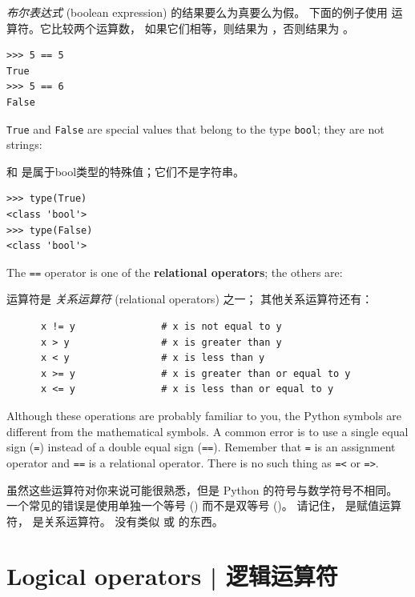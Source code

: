 {{{{\em 布尔表达式} (boolean expression) 的结果要么为真要么为假。
下面的例子使用 \li{==} 运算符。它比较两个运算数，
如果它们相等，则结果为  ，否则结果为  。

\begin{lstlisting}
>>> 5 == 5
True
>>> 5 == 6
False
\end{lstlisting}

%
{\tt True} and {\tt False} are special
values that belong to the type {\tt bool}; they are not strings:

 和  是属于bool类型的特殊值；它们不是字符串。
  
  
  

\begin{lstlisting}
>>> type(True)
<class 'bool'>
>>> type(False)
<class 'bool'>
\end{lstlisting}

%
The {\tt ==} operator is one of the {\bf relational operators}; the
others are:

\li{==} 运算符是 {\em 关系运算符} (relational operators) 之一； 其他关系运算符还有：


\begin{lstlisting}
      x != y               # x is not equal to y
      x > y                # x is greater than y
      x < y                # x is less than y
      x >= y               # x is greater than or equal to y
      x <= y               # x is less than or equal to y
\end{lstlisting}

%
Although these operations are probably familiar to you, the Python
symbols are different from the mathematical symbols.  A common error
is to use a single equal sign ({\tt =}) instead of a double equal sign
({\tt ==}).  Remember that {\tt =} is an assignment operator and
{\tt ==} is a relational operator.   There is no such thing as
{\tt =<} or {\tt =>}.

虽然这些运算符对你来说可能很熟悉，但是 Python 的符号与数学符号不相同。
一个常见的错误是使用单独一个等号 (\li{=}) 而不是双等号 (\li{==})。
请记住， \li{=} 是赋值运算符， \li{==} 是关系运算符。 没有类似 \li{=<} 或 \li{=>} 的东西。

  
  

\section {Logical operators  |  逻辑运算符}
  

}}}
